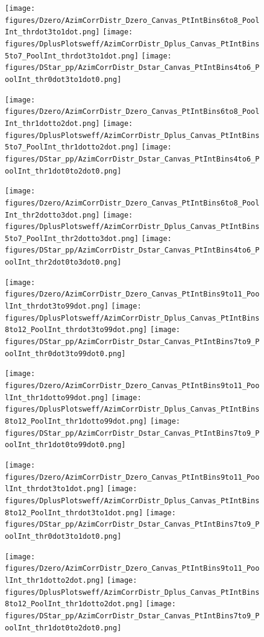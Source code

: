 \begin{figure}[!htbp]
\centering



{\texttt{[image: figures/Dzero/AzimCorrDistr\_Dzero\_Canvas\_PtIntBins6to8\_PoolInt\_thrdot3to1dot.png]}}
{\texttt{[image: figures/DplusPlotsweff/AzimCorrDistr\_Dplus\_Canvas\_PtIntBins5to7\_PoolInt\_thrdot3to1dot.png]}}
{\texttt{[image: figures/DStar\_pp/AzimCorrDistr\_Dstar\_Canvas\_PtIntBins4to6\_PoolInt\_thr0dot3to1dot0.png]}}

{\texttt{[image: figures/Dzero/AzimCorrDistr\_Dzero\_Canvas\_PtIntBins6to8\_PoolInt\_thr1dotto2dot.png]}}
{\texttt{[image: figures/DplusPlotsweff/AzimCorrDistr\_Dplus\_Canvas\_PtIntBins5to7\_PoolInt\_thr1dotto2dot.png]}}
{\texttt{[image: figures/DStar\_pp/AzimCorrDistr\_Dstar\_Canvas\_PtIntBins4to6\_PoolInt\_thr1dot0to2dot0.png]}}

{\texttt{[image: figures/Dzero/AzimCorrDistr\_Dzero\_Canvas\_PtIntBins6to8\_PoolInt\_thr2dotto3dot.png]}}
{\texttt{[image: figures/DplusPlotsweff/AzimCorrDistr\_Dplus\_Canvas\_PtIntBins5to7\_PoolInt\_thr2dotto3dot.png]}}
{\texttt{[image: figures/DStar\_pp/AzimCorrDistr\_Dstar\_Canvas\_PtIntBins4to6\_PoolInt\_thr2dot0to3dot0.png]}}




\end{figure}

\begin{figure}[!htbp]
\centering

{\texttt{[image: figures/Dzero/AzimCorrDistr\_Dzero\_Canvas\_PtIntBins9to11\_PoolInt\_thrdot3to99dot.png]}}
{\texttt{[image: figures/DplusPlotsweff/AzimCorrDistr\_Dplus\_Canvas\_PtIntBins8to12\_PoolInt\_thrdot3to99dot.png]}}
{\texttt{[image: figures/DStar\_pp/AzimCorrDistr\_Dstar\_Canvas\_PtIntBins7to9\_PoolInt\_thr0dot3to99dot0.png]}}


{\texttt{[image: figures/Dzero/AzimCorrDistr\_Dzero\_Canvas\_PtIntBins9to11\_PoolInt\_thr1dotto99dot.png]}}
{\texttt{[image: figures/DplusPlotsweff/AzimCorrDistr\_Dplus\_Canvas\_PtIntBins8to12\_PoolInt\_thr1dotto99dot.png]}}
{\texttt{[image: figures/DStar\_pp/AzimCorrDistr\_Dstar\_Canvas\_PtIntBins7to9\_PoolInt\_thr1dot0to99dot0.png]}}






{\texttt{[image: figures/Dzero/AzimCorrDistr\_Dzero\_Canvas\_PtIntBins9to11\_PoolInt\_thrdot3to1dot.png]}}
{\texttt{[image: figures/DplusPlotsweff/AzimCorrDistr\_Dplus\_Canvas\_PtIntBins8to12\_PoolInt\_thrdot3to1dot.png]}}
{\texttt{[image: figures/DStar\_pp/AzimCorrDistr\_Dstar\_Canvas\_PtIntBins7to9\_PoolInt\_thr0dot3to1dot0.png]}}

{\texttt{[image: figures/Dzero/AzimCorrDistr\_Dzero\_Canvas\_PtIntBins9to11\_PoolInt\_thr1dotto2dot.png]}}
{\texttt{[image: figures/DplusPlotsweff/AzimCorrDistr\_Dplus\_Canvas\_PtIntBins8to12\_PoolInt\_thr1dotto2dot.png]}}
{\texttt{[image: figures/DStar\_pp/AzimCorrDistr\_Dstar\_Canvas\_PtIntBins7to9\_PoolInt\_thr1dot0to2dot0.png]}}

\end{figure}

